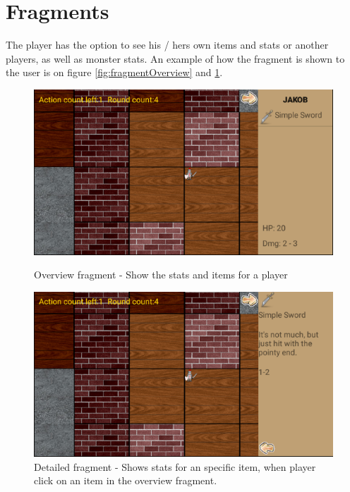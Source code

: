 \section{Fragments}

The player has the option to see his / hers own items and stats or another players, as well as monster stats. An example of how the fragment is shown to the user is on figure \ref{fig:fragmentOverview} and \ref{fig:fragmentDetailed}.

\begin{figure}[ht!]
	\centering
	\begin{minipage}[t]{0.48\textwidth}
		\includegraphics[width=\textwidth]{images/fragmentOverview.png}
		\caption{Overview fragment - Show the stats and items for a player}
		\label{fig:fragmentOverview}
	\end{minipage}
	\hfill
	\begin{minipage}[t]{0.48\textwidth}
		\includegraphics[width=\textwidth]{images/fragmentDetailed.png}
		\caption{Detailed fragment -  Shows stats for an specific item, when player click on an item in the overview fragment.}
		\label{fig:fragmentDetailed}
	\end{minipage}
\end{figure}

